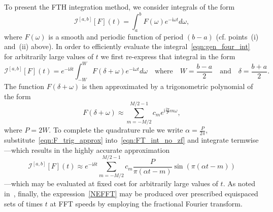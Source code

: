 \documentclass[11pt]{article}
\theoremstyle{plain}
\theoremstyle{remark}
\begin{document}
To present the FTH integration method, we consider integrals of the form
\begin{equation}\label{eqn:gen_four_int}
    \mathcal{I}^{[a,b]}[F](t) = \int_{a}^b F(\omega)e^{-\mathrm{i}\omega t}d\omega,
\end{equation}
where $F(\omega)$ is a smooth and periodic function of period $(b-a)$
(cf. points~(i) and~(ii) above). In order to efficiently evaluate the
integral~\eqref{eqn:gen_four_int} for arbitrarily large values of $t$
we first re-express that integral in the form
\begin{equation}\label{eqn:FT_int_no_zf}
    \mathcal{I}^{[a,b]}[F](t) = e^{-\mathrm{i}\delta t}\int_{-W}^W F(\delta + \omega)e^{-\mathrm{i}\omega t}d\omega \quad \text{where} \quad W = \frac{b - a}{2} \quad \text{and} \quad \delta = \frac{b + a}{2}.
\end{equation}
The function $F(\delta + \omega)$ is then approximated by a trigonometric polynomial of the form
\begin{equation}\label{eqn:F_trig_approx}
    F(\delta + \omega) \approx \sum_{m = -M/2}^{M/2 - 1} c_me^{\mathrm{i}\frac{2\pi}{P}m\omega},
  \end{equation}
where $P = 2W$. To complete the quadrature rule we write $\alpha = \frac{P}{2\pi}$,  substitute~\eqref{eqn:F_trig_approx} into~\eqref{eqn:FT_int_no_zf} and integrate termwise---which results in the highly accurate approximation
\begin{equation}\label{NEFFT}
  \mathcal{I}^{[a,b]}[F](t) \approx e^{-\mathrm{i}\delta t} \sum_{m = -M/2}^{M/2 - 1} c_m \frac{P}{\pi(\alpha t - m)}\sin\left(\pi(\alpha t - m)\right)
\end{equation}
---which may be evaluated at fixed cost for arbitrarily large values
of $t$. As noted in~\cite{abl}, finally, the expression~\eqref{NEFFT}
may be produced over prescribed equispaced sets of times $t$ at FFT
speeds by employing the fractional Fourier transform.
\end{document}
